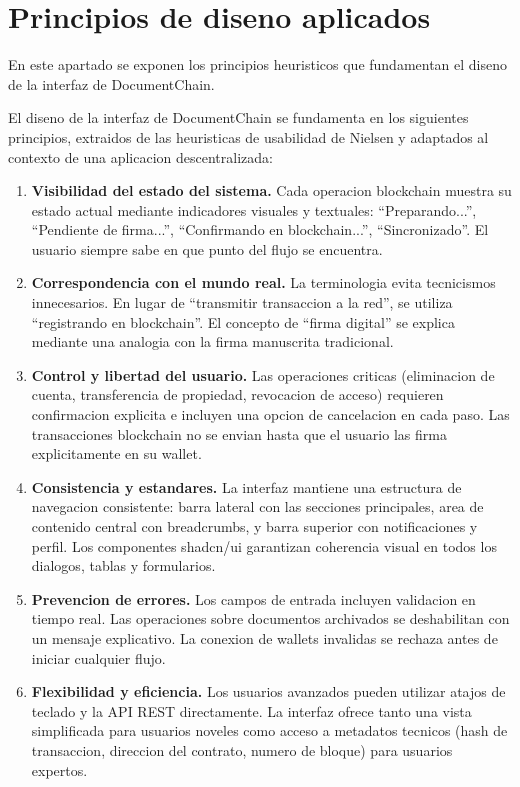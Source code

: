 \documentclass[11pt, a4paper]{article}
\begin{document}
\section{Principios de diseno aplicados}

En este apartado se exponen los principios heuristicos que fundamentan el diseno de la interfaz de DocumentChain.

El diseno de la interfaz de DocumentChain se fundamenta en los siguientes principios, extraidos de las heuristicas de usabilidad de Nielsen y adaptados al contexto de una aplicacion descentralizada:

\begin{enumerate}
    \item \textbf{Visibilidad del estado del sistema.} Cada operacion blockchain muestra su estado actual mediante indicadores visuales y textuales: ``Preparando...'', ``Pendiente de firma...'', ``Confirmando en blockchain...'', ``Sincronizado''. El usuario siempre sabe en que punto del flujo se encuentra.
    \item \textbf{Correspondencia con el mundo real.} La terminologia evita tecnicismos innecesarios. En lugar de ``transmitir transaccion a la red'', se utiliza ``registrando en blockchain''. El concepto de ``firma digital'' se explica mediante una analogia con la firma manuscrita tradicional.
    \item \textbf{Control y libertad del usuario.} Las operaciones criticas (eliminacion de cuenta, transferencia de propiedad, revocacion de acceso) requieren confirmacion explicita e incluyen una opcion de cancelacion en cada paso. Las transacciones blockchain no se envian hasta que el usuario las firma explicitamente en su wallet.
    \item \textbf{Consistencia y estandares.} La interfaz mantiene una estructura de navegacion consistente: barra lateral con las secciones principales, area de contenido central con breadcrumbs, y barra superior con notificaciones y perfil. Los componentes shadcn/ui garantizan coherencia visual en todos los dialogos, tablas y formularios.
    \item \textbf{Prevencion de errores.} Los campos de entrada incluyen validacion en tiempo real. Las operaciones sobre documentos archivados se deshabilitan con un mensaje explicativo. La conexion de wallets invalidas se rechaza antes de iniciar cualquier flujo.
    \item \textbf{Flexibilidad y eficiencia.} Los usuarios avanzados pueden utilizar atajos de teclado y la API REST directamente. La interfaz ofrece tanto una vista simplificada para usuarios noveles como acceso a metadatos tecnicos (hash de transaccion, direccion del contrato, numero de bloque) para usuarios expertos.
\end{enumerate}
\end{document}
